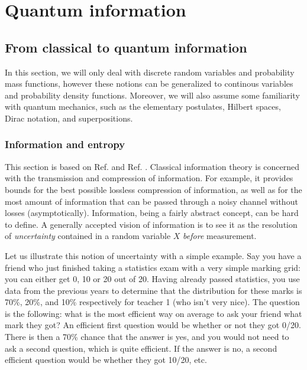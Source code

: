 \chapter{Quantum information} \label{chap:quantum_information}

\section{From classical to quantum information} \label{sec:classical_information}

In this section, we will only deal with discrete random variables and probability mass functions, however these notions can be generalized to continous variables and probability density functions. Moreover, we will also assume some familiarity with quantum mechanics, such as the elementary postulates, Hilbert spaces, Dirac notation, and superpositions.



\subsection{Information and entropy}

This section is based on Ref. \cite[pp. 1--56]{cover_elements_2006} and Ref. \cite[pp. 500--506]{nielsen_quantum_2010}. Classical information theory is concerned with the transmission and compression of information. For example, it provides bounds for the best possible lossless compression of information, as well as for the most amount of information that can be passed through a noisy channel without losses (asymptotically). Information, being a fairly abstract concept, can be hard to define. A generally accepted vision of information is to see it as the resolution of \textit{uncertainty} contained in a random variable $X$ \textit{before} measurement.

Let us illustrate this notion of uncertainty with a simple example. Say you have a friend who just finished taking a statistics exam with a very simple marking grid: you can either get 0, 10 or 20 out of 20. Having already passed statistics, you use data from the previous years to determine that the distribution for these marks is 70\%, 20\%, and 10\% respectively for teacher 1 (who isn't very nice). The question is the following: what is the most efficient way on average to ask your friend what mark they got? An efficient first question would be whether or not they got 0/20. There is then a 70\% chance that the answer is yes, and you would not need to ask a second question, which is quite efficient. If the answer is no, a second efficient question would be whether they got 10/20, etc.

